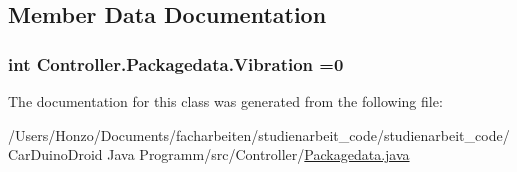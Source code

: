\subsection{Member Data Documentation}
\hypertarget{class_controller_1_1_packagedata_a1ae42703effca15cd5f90067aa8e07c8}{}
\subsubsection[{Vibration}]{\setlength{\rightskip}{0pt plus 5cm}int Controller.\+Packagedata.\+Vibration =0}\label{class_controller_1_1_packagedata_a1ae42703effca15cd5f90067aa8e07c8}


The documentation for this class was generated from the following file\+:\begin{DoxyCompactItemize}
\item 
/\+Users/\+Honzo/\+Documents/facharbeiten/studienarbeit\+\_\+code/studienarbeit\+\_\+code/\+Car\+Duino\+Droid Java Programm/src/\+Controller/\hyperlink{_packagedata_8java}{Packagedata.\+java}\end{DoxyCompactItemize}
